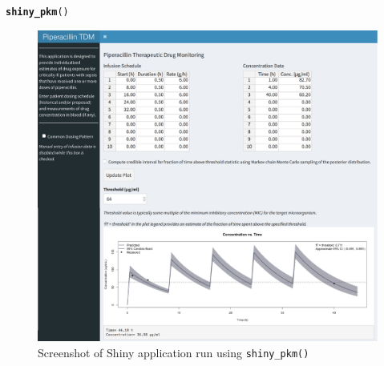 \documentclass{article}\usepackage[]{graphicx}\usepackage[]{color}
\makeatletter
\newcommand{\hlstd}[1]{\textcolor[rgb]{0.345,0.345,0.345}{#1}}%
\newcommand{\hlkwd}[1]{\textcolor[rgb]{0.737,0.353,0.396}{\textbf{#1}}}%
\newenvironment{kframe}{%
 \def\at@end@of@kframe{}%
 \ifinner\ifhmode%
  \def\at@end@of@kframe{\end{minipage}}%
  \begin{minipage}{\columnwidth}%
 \fi\fi%
 \def\FrameCommand##1{\hskip\@totalleftmargin \hskip-\fboxsep
 \colorbox{shadecolor}{##1}\hskip-\fboxsep
     \hskip-\linewidth \hskip-\@totalleftmargin \hskip\columnwidth}%
 \MakeFramed {\advance\hsize-\width
   \@totalleftmargin\z@ \linewidth\hsize
   \@setminipage}}%
 {\par\unskip\endMakeFramed%
 \at@end@of@kframe}
\newenvironment{knitrout}{}{} %
\makeatother
\begin{document}
\begin{knitrout}
\color{fgcolor}\begin{kframe}
\begin{alltt}
\hlkwd{shiny_pkm}\hlstd{()}
\end{alltt}
\end{kframe}
\end{knitrout}


\begin{figure}
\caption{Screenshot of Shiny application run using \texttt{shiny_pkm()}}

\includegraphics[scale=0.5]{appscreenshot.pdf}

\end{figure}
\end{document}
